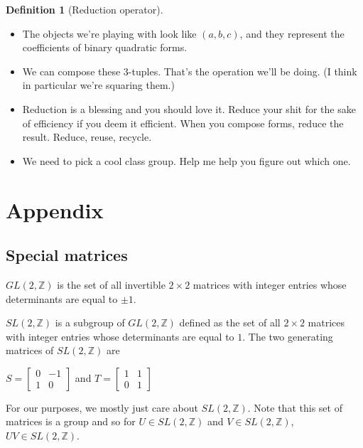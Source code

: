 \documentclass{article}
\theoremstyle{definition}
\newtheorem{definition}{Definition}[section]
\theoremstyle{theorem}
\theoremstyle{example}
\theoremstyle{corollary}
\begin{document}
\begin{definition}[Reduction operator]
\begin{itemize}
\item The objects we're playing with look like \((a, b, c)\), and they represent the coefficients of binary quadratic forms.
\item We can compose these 3-tuples. That's the operation we'll be doing. (I think in particular we're squaring them.)
\item Reduction is a blessing and you should love it. Reduce your shit for the sake of efficiency if you deem it efficient. When you compose forms, reduce the result. Reduce, reuse, recycle.
\item We need to pick a cool class group. Help me help you figure out which one.
\end{itemize}










\newpage

\section{Appendix}

\bigskip

\subsection{Special matrices}

\(GL(2, \mathbb{Z})\) is the set of all invertible \(2 \times 2\) matrices with integer entries whose determinants are equal to \(\pm 1\).

\bigskip

\(SL(2, \mathbb{Z})\) is a subgroup of \(GL(2, \mathbb{Z})\) defined as the set of all \(2 \times 2\) matrices with integer entries whose determinants are equal to \(1\). The two generating matrices of \(SL(2, \mathbb{Z})\) are
\begin{center}
\(S = \begin{bmatrix} 0 & -1 \\ 1 & 0 \end{bmatrix}\) \quad and \quad \(T = \begin{bmatrix} 1 & 1 \\ 0 & 1 \end{bmatrix}\)
\end{center}

\bigskip

For our purposes, we mostly just care about \(SL(2, \mathbb{Z})\). Note that this set of matrices is a group and so for \(U \in SL(2, \mathbb{Z})\) and \(V \in SL(2, \mathbb{Z})\), \(UV \in SL(2, \mathbb{Z})\).


\end{definition}
\end{document}
